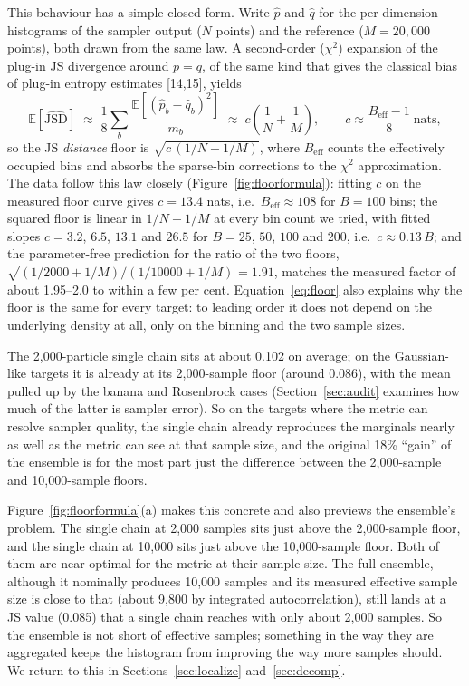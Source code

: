 \documentclass[11pt]{article}
\begin{document}
This behaviour has a simple closed form. Write $\hat p$ and $\hat q$ for the
per-dimension histograms of the sampler output ($N$ points) and the reference
($M=20{,}000$ points), both drawn from the same law. A second-order ($\chi^2$)
expansion of the plug-in JS divergence around $p=q$, of the same kind that
gives the classical bias of plug-in entropy estimates [14,15], yields
\begin{equation}
\mathbb{E}\!\left[\widehat{\mathrm{JSD}}\right]
\;\approx\; \frac{1}{8}\sum_b \frac{\mathbb{E}[(\hat p_b-\hat q_b)^2]}{m_b}
\;\approx\; c\left(\frac{1}{N}+\frac{1}{M}\right), \qquad
c \approx \frac{B_{\mathrm{eff}}-1}{8}\ \text{nats},
\label{eq:floor}
\end{equation}
so the JS \emph{distance} floor is $\sqrt{c\,(1/N+1/M)}$, where
$B_{\mathrm{eff}}$ counts the effectively occupied bins and absorbs the
sparse-bin corrections to the $\chi^2$ approximation. The data follow this law
closely (Figure~\ref{fig:floorformula}): fitting $c$ on the measured floor
curve gives $c=13.4$ nats, i.e.\ $B_{\mathrm{eff}}\approx 108$ for $B=100$
bins; the squared floor is linear in $1/N+1/M$ at every bin count we tried,
with fitted slopes $c=3.2$, $6.5$, $13.1$ and $26.5$ for $B=25$, $50$, $100$
and $200$, i.e.\ $c\approx 0.13\,B$; and the parameter-free prediction for the
ratio of the two floors,
$\sqrt{(1/2000+1/M)/(1/10000+1/M)}=1.91$, matches the measured factor of
about 1.95--2.0 to within a few per cent. Equation~\eqref{eq:floor} also
explains why the floor is the same for every target: to leading order it does
not depend on the underlying density at all, only on the binning and the two
sample sizes.

The 2{,}000-particle single chain sits at about 0.102 on average; on the
Gaussian-like targets it is already at its 2{,}000-sample floor (around
0.086), with the mean pulled up by the banana and Rosenbrock cases
(Section~\ref{sec:audit} examines how much of the latter is sampler error).
So on the targets where the metric can resolve sampler quality, the single
chain already reproduces the marginals nearly as well as the metric can see at
that sample size, and the original 18\% ``gain'' of the ensemble is for the
most part just the difference between the 2{,}000-sample and 10{,}000-sample
floors.

Figure~\ref{fig:floorformula}(a) makes this concrete and also previews the
ensemble's problem. The single chain at 2{,}000 samples sits just above the
2{,}000-sample floor, and the single chain at 10{,}000 sits just above the
10{,}000-sample floor. Both of them are near-optimal for the metric at their
sample size. The full ensemble, although it nominally produces 10{,}000
samples and its measured effective sample size is close to that (about 9{,}800
by integrated autocorrelation), still lands at a JS value (0.085) that a
single chain reaches with only about 2{,}000 samples. So the ensemble is not
short of effective samples; something in the way they are aggregated keeps the
histogram from improving the way more samples should. We return to this in
Sections~\ref{sec:localize} and~\ref{sec:decomp}.
\end{document}
